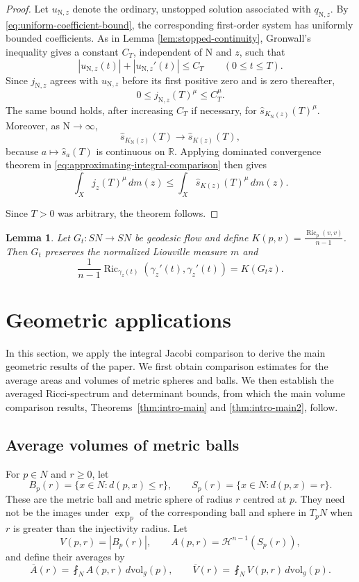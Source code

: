 \documentclass[11pt, reqno]{amsart}
\newtheorem{lemma}{Lemma}
\begin{document}
\begin{proof}
Let $u_{{\mathrm{N}}, z}$ denote the ordinary, unstopped solution associated with $q_{{\mathrm{N}}, z}$. By \eqref{eq:uniform-coefficient-bound}, the corresponding first-order system has uniformly bounded coefficients. As in Lemma \ref{lem:stopped-continuity}, Gronwall's inequality gives a constant $C_T$, independent of ${\mathrm{N}}$ and $z$,
such that
$$
|u_{{\mathrm{N}}, z}(t)|+|u_{{\mathrm{N}}, z}'(t)|\le C_T
\qquad
(0\le t\le T).
$$
Since $j_{{\mathrm{N}}, z}$ agrees with $u_{{\mathrm{N}}, z}$ before its first positive zero and is zero thereafter,
$$
0\le j_{{\mathrm{N}}, z}(T)^\mu\le C_T^\mu.
$$
The same bound holds, after increasing $C_T$ if necessary, for $\widehat s_{K_{\mathrm{N}}(z)}(T)^\mu$. Moreover, as $\mathrm{N} \rightarrow \infty$,
$$
\widehat s_{K_{\mathrm{N}}(z)}(T) \longrightarrow \widehat s_{K(z)}(T),
$$
because $a\mapsto\widehat s_a(T)$ is continuous on $\mathbb R$. Applying dominated convergence theorem in \eqref{eq:approximating-integral-comparison} then gives
$$
\int_Xj_z(T)^\mu\, dm(z) \le \int_X\widehat s_{K(z)}(T)^\mu\, dm(z).
$$

Since $T>0$ was arbitrary, the theorem follows.
\end{proof}
\begin{lemma}\label{lem:flow-shuffle}
Let $G_t:SN\to SN$ be geodesic flow and define $K(p, v)=\frac{\operatorname{Ric}_p(v, v)}{n-1}$. Then $G_t$ preserves the normalized Liouville measure $m$ and
$$
\frac{1}{n-1}
\operatorname{Ric}_{\gamma_z(t)}(\gamma_z'(t), \gamma_z'(t))
=K(G_tz).
$$
\end{lemma}

\section{Geometric applications}\label{sec:geometric applications}
In this section, we apply the integral Jacobi comparison to derive the main geometric results of the paper. We first obtain comparison estimates for the average areas and volumes of metric spheres and balls. We then establish the averaged Ricci-spectrum and determinant bounds, from which the main volume comparison results, Theorems~\ref{thm:intro-main} and
\ref{thm:intro-main2}, follow.
\subsection{Average volumes of metric balls}
For $p\in N$ and $r\ge 0$, let
$$
B_p(r)=\{x\in N:d(p, x)\le r\},
\qquad
S_p(r)=\{x\in N:d(p, x)=r\}.
$$
These are the metric ball and metric sphere of radius $r$ centred at $p$. They need not be the images under $\exp_p$ of the corresponding ball and sphere in $T_pN$ when $r$ is greater than the injectivity radius. Let
$$
V(p, r)=|B_p(r)|,
\qquad
A(p, r)=\mathcal H^{n-1}(S_p(r)),
$$
and define their averages by
\begin{equation*}\label{eq:average-area-volume}
\overline A(r)=\fint_N A(p, r)\, d\mathrm{vol}_g(p),
\qquad
\overline V(r)=\fint_N V(p, r)\, d\mathrm{vol}_g(p).
\end{equation*}
\end{document}
